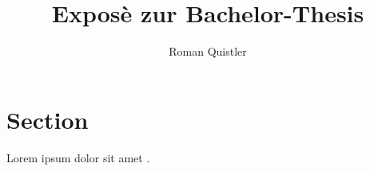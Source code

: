 \documentclass[a4paper, 11pt]{scrartcl}
\title{Exposè zur Bachelor-Thesis}
\author{Roman Quistler}
\begin{document}
	
	
	
	\newpage
	\tableofcontents
	\newpage
	
	\section{Section}
	\label{sec:einleitende-worte}

	
	Lorem ipsum dolor sit amet \cite{chomsky1957}.
	
	\newpage
	
	\begin{appendix}
		\listoffigures
	\end{appendix}
	
	\printbibliography
	
\end{document}

